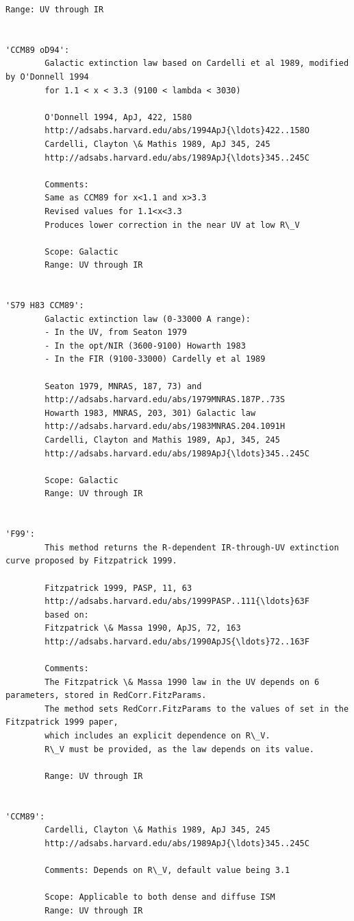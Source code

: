 \documentclass[11pt]{article}
\begin{document}
\begin{Verbatim}[commandchars=\\\{\}]
        Range: UV through IR
        
        
'CCM89 oD94': 
        Galactic extinction law based on Cardelli et al 1989, modified by O'Donnell 1994
        for 1.1 < x < 3.3 (9100 < lambda < 3030)
        
        O'Donnell 1994, ApJ, 422, 1580
        http://adsabs.harvard.edu/abs/1994ApJ{\ldots}422..158O
        Cardelli, Clayton \& Mathis 1989, ApJ 345, 245
        http://adsabs.harvard.edu/abs/1989ApJ{\ldots}345..245C

        Comments:
        Same as CCM89 for x<1.1 and x>3.3
        Revised values for 1.1<x<3.3
        Produces lower correction in the near UV at low R\_V
        
        Scope: Galactic
        Range: UV through IR
        
        
'S79 H83 CCM89': 
        Galactic extinction law (0-33000 A range):
        - In the UV, from Seaton 1979
        - In the opt/NIR (3600-9100) Howarth 1983
        - In the FIR (9100-33000) Cardelly et al 1989
        
        Seaton 1979, MNRAS, 187, 73) and 
        http://adsabs.harvard.edu/abs/1979MNRAS.187P..73S
        Howarth 1983, MNRAS, 203, 301) Galactic law
        http://adsabs.harvard.edu/abs/1983MNRAS.204.1091H
        Cardelli, Clayton and Mathis 1989, ApJ, 345, 245
        http://adsabs.harvard.edu/abs/1989ApJ{\ldots}345..245C
        
        Scope: Galactic
        Range: UV through IR
        
        
'F99': 
        This method returns the R-dependent IR-through-UV extinction curve proposed by Fitzpatrick 1999.

        Fitzpatrick 1999, PASP, 11, 63
        http://adsabs.harvard.edu/abs/1999PASP..111{\ldots}63F
        based on: 
        Fitzpatrick \& Massa 1990, ApJS, 72, 163
        http://adsabs.harvard.edu/abs/1990ApJS{\ldots}72..163F
        
        Comments:
        The Fitzpatrick \& Massa 1990 law in the UV depends on 6 parameters, stored in RedCorr.FitzParams.
        The method sets RedCorr.FitzParams to the values of set in the Fitzpatrick 1999 paper, 
        which includes an explicit dependence on R\_V.
        R\_V must be provided, as the law depends on its value.
        
        Range: UV through IR

        
'CCM89': 
        Cardelli, Clayton \& Mathis 1989, ApJ 345, 245
        http://adsabs.harvard.edu/abs/1989ApJ{\ldots}345..245C

        Comments: Depends on R\_V, default value being 3.1

        Scope: Applicable to both dense and diffuse ISM
        Range: UV through IR
        
        

    \end{Verbatim}
\end{document}
